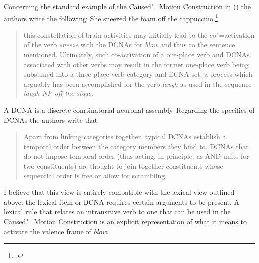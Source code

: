 \begin{exe}
\begin{xlist}[iv.]
\begin{exe}
\begin{xlist}[iv.]
Concerning the standard example of the Caused"=Motion Construction in () the authors write the
following:
\ea
She sneezed the foam off the cappuccino.\footnote{
.
}
\z
\begin{quote}
  this constellation of brain activities may initially lead to the co"=activation of the verb \emph{sneeze}
  with the DCNAs for \emph{blow} and thus to the sentence mentioned. Ultimately, such co-activation of a
  one-place verb and DCNAs associated with other verbs may result in the former one-place verb being
  subsumed into a three-place verb category and DCNA set, a process which arguably has been
  accomplished for the verb \emph{laugh} as used in the sequence \emph{laugh NP off the stage}. \citep*{PCShandbookCxG}
\end{quote}
A DCNA is a discrete combinatorial neuronal assembly. Regarding the specifics of DCNAs the authors write that 
\begin{quote}
Apart from linking categories together, typical DCNAs establish a temporal order between the
category members they bind to. DCNAs that do not impose temporal order (thus acting, in principle,
as AND units for two constituents) are thought to join together constituents whose sequential order
is free or allow for scrambling. \citep*[]{PCShandbookCxG}
\end{quote}
I believe that this view is entirely compatible with the lexical view outlined above: the lexical
item or DCNA requires certain arguments to be present. A lexical rule that relates an intransitive verb
to one that can be used in the Caused"=Motion Construction is an
explicit representation of what it means to activate the valence frame of \emph{blow}.


\end{xlist}
\end{exe}
\end{xlist}
\end{exe}
